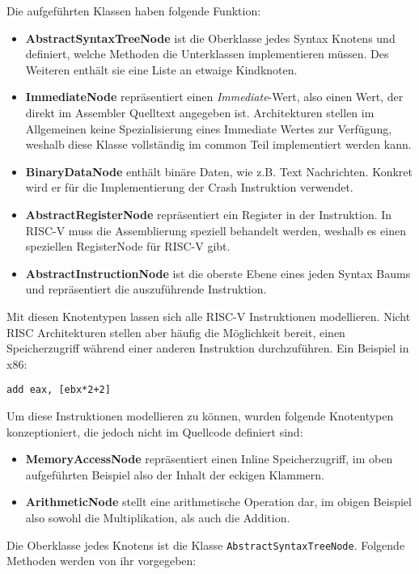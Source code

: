 Die aufgeführten Klassen haben folgende Funktion:
\begin{itemize}
	\item \textbf{AbstractSyntaxTreeNode} ist die Oberklasse jedes Syntax Knotens
	und definiert, welche Methoden die Unterklassen implementieren müssen. Des
	Weiteren enthält sie eine Liste an etwaige Kindknoten.
	\item \textbf{ImmediateNode} repräsentiert einen \textit{Immediate}-Wert,
	also einen Wert, der direkt im Assembler Quelltext angegeben ist. Architekturen
	stellen im Allgemeinen keine Spezialisierung eines Immediate Wertes zur
	Verfügung, weshalb diese Klasse vollständig im common Teil implementiert werden
	kann.
	\item \textbf{BinaryDataNode} enthält binäre Daten, wie z.B. Text Nachrichten.
	Konkret wird er für die Implementierung der Crash Instruktion verwendet.
	\item \textbf{AbstractRegisterNode} repräsentiert ein Register in der
	Instruktion. In RISC-V muss die Assemblierung speziell behandelt werden,
	weshalb es einen speziellen RegisterNode für RISC-V gibt.
	\item \textbf{AbstractInstructionNode} ist die oberste Ebene eines jeden Syntax
	Baums und repräsentiert die auszuführende Instruktion.
\end{itemize}
Mit diesen Knotentypen lassen sich alle RISC-V Instruktionen modellieren. Nicht
RISC Architekturen stellen aber häufig die Möglichkeit bereit, einen Speicherzugriff
während einer anderen Instruktion durchzuführen. Ein Beispiel in x86:
\begin{lstlisting}[language={[x86masm]Assembler}]
add eax, [ebx*2+2]
\end{lstlisting}
Um diese Instruktionen modellieren zu können, wurden folgende Knotentypen
konzeptioniert, die jedoch nicht im Quellcode definiert sind:
\begin{itemize}
	\item \textbf{MemoryAccessNode} repräsentiert einen Inline Speicherzugriff,
	im oben aufgeführten Beispiel also der Inhalt der eckigen Klammern.
	\item \textbf{ArithmeticNode} stellt eine arithmetische Operation dar, im
	obigen Beispiel also sowohl die Multiplikation, als auch die Addition.
\end{itemize}

Die Oberklasse jedes Knotens ist die Klasse \texttt{AbstractSyntaxTreeNode}.
Folgende Methoden werden von ihr vorgegeben:

